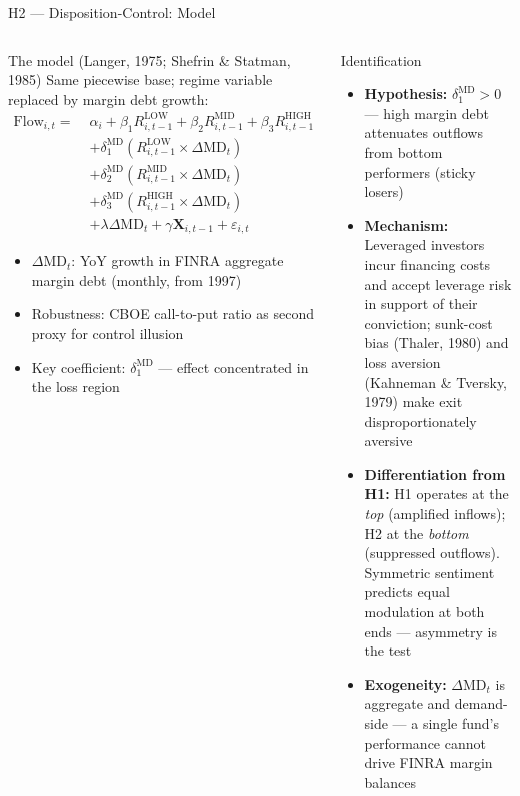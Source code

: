 \documentclass[aspectratio=169,10pt]{beamer}
\begin{document}
\begin{frame}{H2 — Disposition-Control: Model}
\begin{columns}[T]
\begin{block}{The model (Langer, 1975; Shefrin \& Statman, 1985)}
{\footnotesize Same piecewise base; regime variable replaced by margin debt growth:}
{\footnotesize
\begin{align*}
\mathrm{Flow}_{i,t} = \;&\alpha_i + \beta_1 R^{\mathrm{LOW}}_{i,t-1} + \beta_2 R^{\mathrm{MID}}_{i,t-1} + \beta_3 R^{\mathrm{HIGH}}_{i,t-1} \\
&+ \delta^{\mathrm{MD}}_1 (R^{\mathrm{LOW}}_{i,t-1} \times \Delta\mathrm{MD}_t) \\
&+ \delta^{\mathrm{MD}}_2 (R^{\mathrm{MID}}_{i,t-1} \times \Delta\mathrm{MD}_t) \\
&+ \delta^{\mathrm{MD}}_3 (R^{\mathrm{HIGH}}_{i,t-1} \times \Delta\mathrm{MD}_t) \\
&+ \lambda \Delta\mathrm{MD}_t + \gamma \mathbf{X}_{i,t-1} + \varepsilon_{i,t}
\end{align*}}
{\footnotesize
\begin{itemize}
  \item $\Delta\mathrm{MD}_t$: YoY growth in FINRA aggregate margin debt (monthly, from 1997)
  \item Robustness: CBOE call-to-put ratio as second proxy for control illusion
  \item Key coefficient: $\delta^{\mathrm{MD}}_1$ — effect concentrated in the loss region
\end{itemize}}
\end{block}

\begin{block}{Identification}
{\footnotesize
\begin{itemize}
  \item \textbf{Hypothesis:} $\delta^{\mathrm{MD}}_1 > 0$ — high margin debt attenuates outflows from bottom performers (sticky losers)
  \item \textbf{Mechanism:} Leveraged investors incur financing costs and accept leverage risk in support of their conviction; sunk-cost bias (Thaler, 1980) and loss aversion (Kahneman \& Tversky, 1979) make exit disproportionately aversive
  \item \textbf{Differentiation from H1:} H1 operates at the \emph{top} (amplified inflows); H2 at the \emph{bottom} (suppressed outflows). Symmetric sentiment predicts equal modulation at both ends — asymmetry is the test
  \item \textbf{Exogeneity:} $\Delta\mathrm{MD}_t$ is aggregate and demand-side — a single fund's performance cannot drive FINRA margin balances
\end{itemize}}
\end{block}
\end{columns}
\end{frame}
\end{document}
